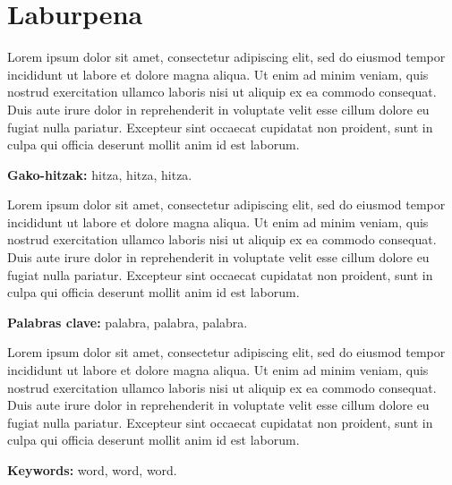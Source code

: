 \chapter*{Laburpena }

Lorem ipsum dolor sit amet, consectetur adipiscing elit, sed do eiusmod tempor incididunt ut labore et dolore magna aliqua. Ut enim ad minim veniam, quis nostrud exercitation ullamco laboris nisi ut aliquip ex ea commodo consequat. Duis aute irure dolor in reprehenderit in voluptate velit esse cillum dolore eu fugiat nulla pariatur. Excepteur sint occaecat cupidatat non proident, sunt in culpa qui officia deserunt mollit anim id est laborum.

\textbf{Gako-hitzak:} hitza, hitza, hitza.


\textcolor{eus-color}{{\serif Lorem ipsum dolor sit amet, consectetur adipiscing elit, sed do eiusmod tempor incididunt ut labore et dolore magna aliqua. Ut enim ad minim veniam, quis nostrud exercitation ullamco laboris nisi ut aliquip ex ea commodo consequat. Duis aute irure dolor in reprehenderit in voluptate velit esse cillum dolore eu fugiat nulla pariatur. Excepteur sint occaecat cupidatat non proident, sunt in culpa qui officia deserunt mollit anim id est laborum.}}

\textcolor{eus-color}{{\serif \textbf{Palabras clave:}} palabra, palabra, palabra.}


\textcolor{eng-color}{Lorem ipsum dolor sit amet, consectetur adipiscing elit, sed do eiusmod tempor incididunt ut labore et dolore magna aliqua. Ut enim ad minim veniam, quis nostrud exercitation ullamco laboris nisi ut aliquip ex ea commodo consequat. Duis aute irure dolor in reprehenderit in voluptate velit esse cillum dolore eu fugiat nulla pariatur. Excepteur sint occaecat cupidatat non proident, sunt in culpa qui officia deserunt mollit anim id est laborum.}

\textcolor{eng-color}{\textbf{Keywords:} word, word, word.}